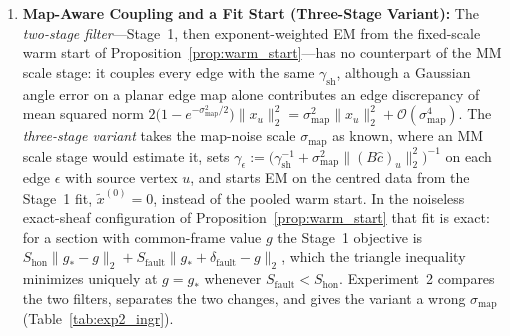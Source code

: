 \documentclass[11pt,a4paper]{article}
\theoremstyle{definition}
\theoremstyle{remark}
\begin{document}
\begin{enumerate}[nosep,leftmargin=1.8em]
  \item \textbf{Map-Aware Coupling and a Fit Start (Three-Stage Variant):} The \emph{two-stage filter}---Stage~1, then exponent-weighted EM from the fixed-scale warm start of Proposition~\ref{prop:warm_start}---has no counterpart of the MM scale stage: it couples every edge with the same $\gamma_{\mathrm{sh}}$, although a Gaussian angle error on a planar edge map alone contributes an edge discrepancy of mean squared norm $2\bigl(1 - e^{-\sigma_{\mathrm{map}}^2/2}\bigr)\|x_u\|_2^2 = \sigma_{\mathrm{map}}^2\|x_u\|_2^2 + \mathcal{O}(\sigma_{\mathrm{map}}^4)$. The \emph{three-stage variant} takes the map-noise scale $\sigma_{\mathrm{map}}$ as known, where an MM scale stage would estimate it, sets $\gamma_\epsilon := \bigl(\gamma_{\mathrm{sh}}^{-1} + \sigma_{\mathrm{map}}^2\|(B\hat{c})_u\|_2^2\bigr)^{-1}$ on each edge $\epsilon$ with source vertex $u$, and starts EM on the centred data from the Stage~1 fit, $\tilde{x}^{(0)} = 0$, instead of the pooled warm start. In the noiseless exact-sheaf configuration of Proposition~\ref{prop:warm_start} that fit is exact: for a section with common-frame value $g$ the Stage~1 objective is $S_{\mathrm{hon}}\|g_* - g\|_2 + S_{\mathrm{fault}}\|g_* + \delta_{\mathrm{fault}} - g\|_2$, which the triangle inequality minimizes uniquely at $g = g_*$ whenever $S_{\mathrm{fault}} < S_{\mathrm{hon}}$. Experiment~2 compares the two filters, separates the two changes, and gives the variant a wrong $\sigma_{\mathrm{map}}$ (Table~\ref{tab:exp2_ingr}).
\end{enumerate}
\end{document}
